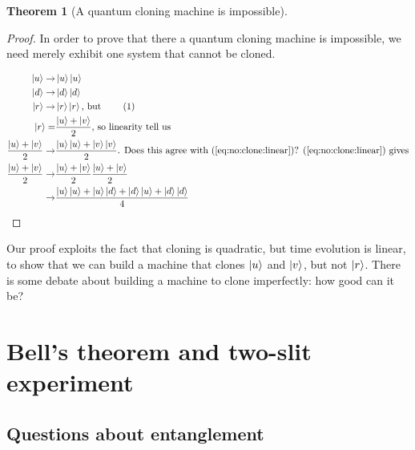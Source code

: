 \documentclass[]{article}
\newcommand\numberthis{\addtocounter{equation}{1}\tag{\theequation}}
\newtheorem{thm}{Theorem}
\begin{document}
\begin{thm}[A quantum cloning machine is impossible]
\end{thm}

\begin{proof}
	 In order to prove that there a quantum cloning machine is impossible, we need merely exhibit one system that cannot be cloned.

	\begin{align*}
		\ket{u}\rightarrow& \ket{u}\ket{u}\\
		\ket{d}\rightarrow& \ket{d}\ket{d}\\
		\ket{r}\rightarrow& \ket{r}\ket{r} \text{, but } \numberthis \label{eq:no:clone:linear}\\
		\ket{r} =& \frac{\ket{u} + \ket{v}}{2} \text{, so linearity tell us}\\
		\frac{\ket{u} +\ket{v}}{2} \rightarrow&  \frac{\ket{u} \ket{u} + \ket{v} \ket{v}}{2} \text{. Does this agree with (\ref{eq:no:clone:linear})? (\ref{eq:no:clone:linear}) gives}\\
		\frac{\ket{u} +\ket{v}}{2}\rightarrow& \frac{\ket{u} +\ket{v}}{2} \frac{\ket{u} +\ket{v}}{2}\\
		\rightarrow& \frac{\ket{u}\ket{u} + \ket{u}\ket{d} + \ket{d}\ket{u}+\ket{d}\ket{d}}{4} 
	\end{align*}

\end{proof}

Our proof exploits the fact that cloning is quadratic, but time evolution is linear, to show that we can build a machine that clones $\ket{u}$ and $\ket{v}$, but not $\ket{r}$. There is some debate about building a machine to clone imperfectly: how good can it be?

\section{Bell's theorem and two-slit experiment}

\subsection{Questions about entanglement}
\end{document}
